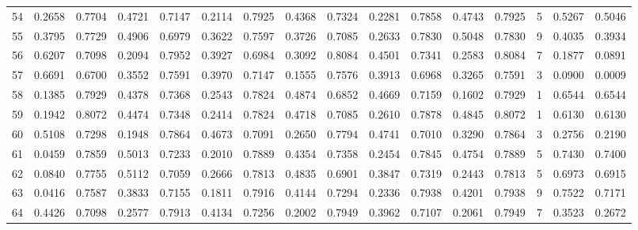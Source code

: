 \begin{tabular}{lrrrrrrrrrrrrrrr}
54  &      0.2658 &  0.7704 &  0.4721 &  0.7147 &  0.2114 &  0.7925 &  0.4368 &  0.7324 &  0.2281 &  0.7858 &   0.4743 &     0.7925 &      5 &                    0.5267 &                     0.5046 \\
55  &      0.3795 &  0.7729 &  0.4906 &  0.6979 &  0.3622 &  0.7597 &  0.3726 &  0.7085 &  0.2633 &  0.7830 &   0.5048 &     0.7830 &      9 &                    0.4035 &                     0.3934 \\
56  &      0.6207 &  0.7098 &  0.2094 &  0.7952 &  0.3927 &  0.6984 &  0.3092 &  0.8084 &  0.4501 &  0.7341 &   0.2583 &     0.8084 &      7 &                    0.1877 &                     0.0891 \\
57  &      0.6691 &  0.6700 &  0.3552 &  0.7591 &  0.3970 &  0.7147 &  0.1555 &  0.7576 &  0.3913 &  0.6968 &   0.3265 &     0.7591 &      3 &                    0.0900 &                     0.0009 \\
58  &      0.1385 &  0.7929 &  0.4378 &  0.7368 &  0.2543 &  0.7824 &  0.4874 &  0.6852 &  0.4669 &  0.7159 &   0.1602 &     0.7929 &      1 &                    0.6544 &                     0.6544 \\
59  &      0.1942 &  0.8072 &  0.4474 &  0.7348 &  0.2414 &  0.7824 &  0.4718 &  0.7085 &  0.2610 &  0.7878 &   0.4845 &     0.8072 &      1 &                    0.6130 &                     0.6130 \\
60  &      0.5108 &  0.7298 &  0.1948 &  0.7864 &  0.4673 &  0.7091 &  0.2650 &  0.7794 &  0.4741 &  0.7010 &   0.3290 &     0.7864 &      3 &                    0.2756 &                     0.2190 \\
61  &      0.0459 &  0.7859 &  0.5013 &  0.7233 &  0.2010 &  0.7889 &  0.4354 &  0.7358 &  0.2454 &  0.7845 &   0.4754 &     0.7889 &      5 &                    0.7430 &                     0.7400 \\
62  &      0.0840 &  0.7755 &  0.5112 &  0.7059 &  0.2666 &  0.7813 &  0.4835 &  0.6901 &  0.3847 &  0.7319 &   0.2443 &     0.7813 &      5 &                    0.6973 &                     0.6915 \\
63  &      0.0416 &  0.7587 &  0.3833 &  0.7155 &  0.1811 &  0.7916 &  0.4144 &  0.7294 &  0.2336 &  0.7938 &   0.4201 &     0.7938 &      9 &                    0.7522 &                     0.7171 \\
64  &      0.4426 &  0.7098 &  0.2577 &  0.7913 &  0.4134 &  0.7256 &  0.2002 &  0.7949 &  0.3962 &  0.7107 &   0.2061 &     0.7949 &      7 &                    0.3523 &                     0.2672 \\

\end{tabular}
